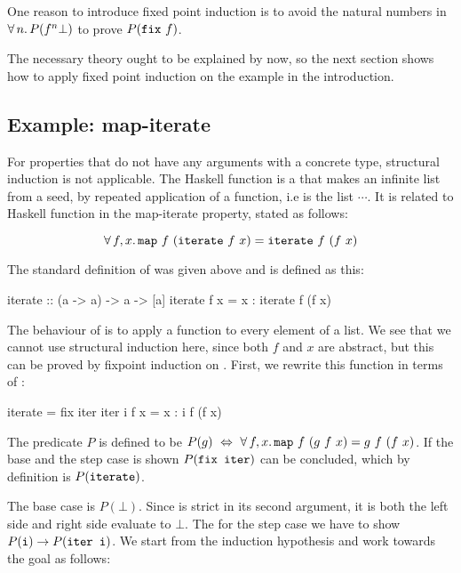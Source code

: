 \noindent
One reason to introduce fixed point induction is to avoid the natural
numbers in $\forall \, n . \, P(f^n \bot)$ to prove $P(\texttt{fix} \,\, f)$.

The necessary theory ought to be explained by now, so the next section
shows how to apply fixed point induction on the example in the
introduction.

\subsection{Example: map-iterate}
\label{sec:mapiter}

For properties that do not have any arguments with a concrete type,
structural induction is not applicable. The Haskell function
 is a that makes an infinite list from a seed, by repeated
application of a function, i.e  is the list
 $\cdots$. It is related to Haskell function
  in the map-iterate property, stated as follows:

\begin{equation*}
\forall \, f , x . \, \texttt{map} \,\, f \,\, (\texttt{iterate} \,\, f \,\, x) =
           \texttt{iterate} \,\, f \,\, (f \,\, x)
\end{equation*}

\noindent
The standard definition of  was given above and 
is defined as this:

\begin{code}
iterate :: (a -> a) -> a -> [a]
iterate f x = x : iterate f (f x)
\end{code}

The behaviour of  is to apply a function to every element of a
list. We see that we cannot use structural induction here, since both
$f$ and $x$ are abstract, but this can be proved by fixpoint induction
on . First, we rewrite this function in terms of :

\begin{code}
iterate = fix iter
iter i f x = x : i f (f x)
\end{code}

\noindent
The predicate $P$ is defined to be $P(g) \,\, \Leftrightarrow \,\,
\forall \, f , x . \, \texttt{map} \,\, f \,\, (g \,\, f \,\, x) = g \,\, f \,\, (f \,\, x)$.
If the base and the step case is shown $P(\texttt{fix iter})$ can be
concluded, which by definition is $P(\texttt{iterate})$.

The base case is $P(\bot)$. Since  is strict in its second
argument, it is both the left side and right side evaluate to $\bot$.
The for the step case we have to show
$P(\texttt{i}) \rightarrow P(\texttt{iter i})$. We start from the induction
hypothesis and work towards the goal as follows:

